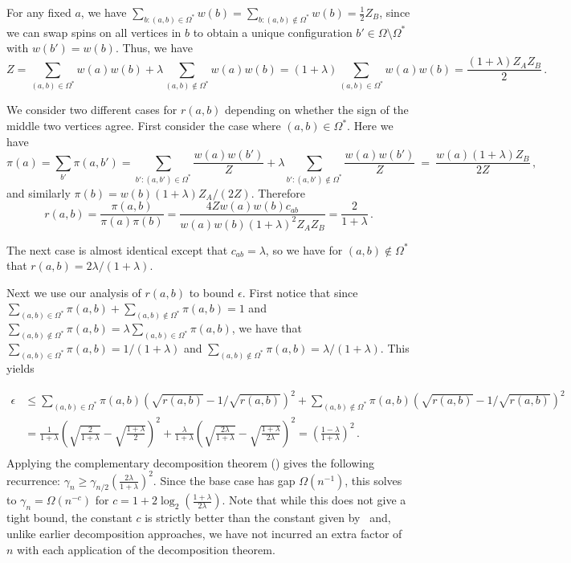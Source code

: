\documentclass{toc}
\begin{document}
For any fixed $a$, we have $\sum_{b: (a,b)\in\Omega^*} w(b) = \sum_{b:
(a,b)\notin\Omega^*} w(b)=\frac{1}{2}Z_B$, since we can swap spins 
on all vertices in $b$ to obtain a unique configuration $b'\in\Omega 
\setminus \Omega^*$ with $w(b')=w(b)$.  
Thus, we have
\[Z = \sum_{(a,b) \in \Omega^*}w(a) w(b) + \lambda \sum_{(a,b) \notin
    \Omega^*}w(a)w(b) = (1 + \lambda)\sum_{(a,b) \in \Omega^*}w(a)
  w(b) = \frac{(1+\lambda)Z_AZ_B}{2}\,.\]

We consider two different cases for $r(a,b)$ depending on
whether the sign of the middle two vertices agree.  First consider
the case where $(a,b) \in \Omega^*$. Here we have
\[\pi(a) = \sum_{b'}\pi(a,b') =\sum_{b': (a,b')\in
\Omega^*} \frac{w(a)w(b')}{Z} + \lambda \sum_{b': (a,b')\notin \Omega^*}
\frac{w(a)w(b')}{Z}~=~ \frac{w(a)(1+\lambda)Z_B}{2Z}\,,\]
and similarly $\pi(b) =w(b)(1+\lambda)Z_A/(2Z)$.  Therefore
\[r(a,b)= \frac{\pi(a,b) }{\pi(a)\pi(b)} = \frac{4Zw(a)w(b)
   c_{ab}}{w(a)w(b)(1+\lambda)^2Z_AZ_B} = \frac{2}{1+\lambda}\,.\]

\noindent The next case is almost identical except that $c_{ab} = \lambda$, 
so we have for $(a,b) \notin \Omega^*$ that $r(a,b) = 2\lambda/(1 + \lambda)$.

Next we use our analysis of $r(a,b)$ to bound $\epsilon$. First 
notice that since $\sum_{(a,b) \in \Omega^*} \pi(a,b) + \sum_{(a,b) 
\notin \Omega^*} \pi(a,b)  = 1$ and $\sum_{(a,b) \notin \Omega^*} 
\pi(a,b) = \lambda \sum_{(a,b) \in \Omega^*}\pi(a,b)$, we have that 
$\sum_{(a,b) \in \Omega^*} \pi(a,b) = 1/(1+\lambda)$ and $\sum_{(a,b) 
\notin \Omega^*} \pi(a,b)  = \lambda/(1 + \lambda)$. This yields

\begin{align*}
\epsilon &\leq
 \sum_{(a,b) \in \Omega^*} \pi(a,b)(\sqrt{r(a,b)} -1/\sqrt{r(a,b)})^2  + \sum_{(a,b) \notin \Omega^*} \pi(a,b)(\sqrt{r(a,b)} -1/\sqrt{r(a,b)})^2\\
&= \frac{1}{1+\lambda} \left(\sqrt{ \frac{2}{1+\lambda}} -\sqrt{ \frac{1+\lambda}{2}}\right)^2 + \frac{\lambda}{1+\lambda} \left(\sqrt{\frac{2\lambda}{1+\lambda}} -\sqrt{ \frac{1+\lambda}{2\lambda}}\right)^2 = \left(\frac{1-\lambda}{1+\lambda}\right)^2\,. \\
\end{align*}
%
Applying the complementary decomposition theorem () 
gives the following recurrence: 
$\gamma_{n} \geq \gamma_{n/2}\left(\frac{2\lambda}{1+\lambda}\right)^2.$
Since the base case has gap $\Omega(n^{-1})$, this solves to $\gamma_n
= \Omega(n^{-c})$ for $c = 1 +
2\log_2\left(\frac{1+\lambda}{2\lambda}\right).$  Note that while this
does not give a tight bound, the constant $c$ is strictly better than
the constant given by~\cite{jstv04} and, unlike earlier
decomposition approaches, we have not incurred an extra factor of $n$
with each application of the decomposition theorem. 
\end{document}
